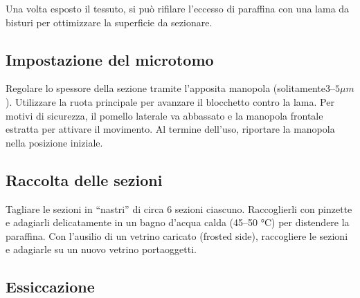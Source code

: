 Una volta esposto il tessuto, si può rifilare l'eccesso di paraffina con una lama da bisturi per ottimizzare la superficie da sezionare.


\subsection{Impostazione del microtomo}

Regolare lo spessore della sezione tramite l'apposita manopola (solitamente$3–5\mu m$). Utilizzare la ruota principale per avanzare il blocchetto contro la lama. Per motivi di sicurezza, il pomello laterale va abbassato e la manopola frontale estratta per attivare il movimento. Al termine dell'uso, riportare la manopola nella posizione iniziale.


\subsection{Raccolta delle sezioni}

Tagliare le sezioni in “nastri” di circa 6 sezioni ciascuno. Raccoglierli con pinzette e adagiarli delicatamente in un bagno d'acqua calda (45–50 °C) per distendere la paraffina. Con l'ausilio di un vetrino caricato (frosted side), raccogliere le sezioni e adagiarle su un nuovo vetrino portaoggetti.


\subsection{Essiccazione}

